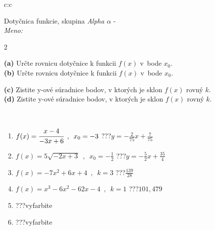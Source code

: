 \documentclass[10pt]{report}
\begin{document}
\thispagestyle{empty}
\begin{tabular}{c:c}
\begin{minipage}[c][104.5mm][t]{0.5\linewidth}
\begin{center}
\vspace{7mm}
{\huge Dotyčnica funkcie, skupina \textit{Alpha $\alpha$} -}\\[5mm]
\textit{Meno:}\phantom{xxxxxxxxxxxxxxxxxxxxxxxxxxxxxxxxxxxxxxxxxxxxxxxxxxxxxxxxxxxxxxxxx}\\[5mm]
\begin{minipage}{0.95\linewidth}
\begin{center}
{\small \begin{multicols}{2} \raggedright
\textbf{(a)} Určte rovnicu dotyčnice k funkcii \(f(x)\) v~bode \(x_0\). \\[1mm]
\textbf{(b)} Určte rovnicu dotyčnice k funkcii \(f(x)\) v~bode \(x_0\). \par \columnbreak
\textbf{(c)} Zistite y-ové súradnice bodov, v ktorých je sklon \(f(x)\) rovný \(k\). \\[1mm]
\textbf{(d)} Zistite y-ové súradnice bodov, v ktorých je sklon \(f(x)\) rovný \(k\). \\[1mm]
\end{multicols}
}
\end{center}
\end{minipage}
\\[4mm]
\begin{minipage}{0.79\linewidth}
\begin{center}
\begin{varwidth}{\linewidth}
\begin{enumerate}
\normalsizerr
\item $f(x)=\cfrac{x-4}{-3x+6}\enspace , \enspace x_0=-3$\quad \dotfill\; ???\;\dotfill \quad $y = -\frac{2}{75}x+\frac{7}{75}$
\item $f(x)=5\sqrt{-2x+3}\enspace , \enspace x_0=-\frac{1}{2}$\quad \dotfill\; ???\;\dotfill \quad $y = -\frac{5}{2}x+\frac{35}{4}$
\item $f(x)=-7x^2+6x+4\enspace , \enspace k=3$\quad \dotfill\; ???\;\dotfill \quad $\frac{139}{28}$
\item $f(x)=x^3-6x^2-62x-4\enspace , \enspace k=1$\quad \dotfill\; ???\;\dotfill \quad $101 , 479$
\item \quad \dotfill\; ???\;\dotfill \quad vyfarbite
\item \quad \dotfill\; ???\;\dotfill \quad vyfarbite
\end{enumerate}

\end{varwidth}
\end{center}
\end{minipage}
\end{center}
\end{minipage}
\end{tabular}
\end{document}

